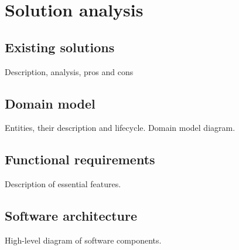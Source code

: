 
\chapter{Solution analysis}\label{ch:solution-analysis}

\section{Existing solutions}\label{sec:existing-solutions}
{\color{gray} Description, analysis, pros and cons}

\section{Domain model}\label{sec:domain-model}
{\color{gray} Entities, their description and lifecycle. Domain model diagram.}

\section{Functional requirements}\label{sec:functional-requirements}
{\color{gray} Description of essential features.}

\section{Software architecture}\label{sec:software-architecture}
{\color{gray} High-level diagram of software components.}